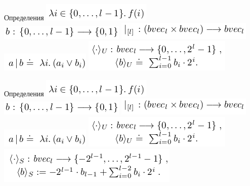 \documentclass{beamer}
\begin{document}
\begin{frame}{Определения}
\includegraphics[scale=0.5]{lambda.png}\newline
\includegraphics[scale=0.5]{vector.png}\newline
\includegraphics[scale=0.5]{or1.png}\newline
\includegraphics[scale=0.5]{or2.png}\newline
\includegraphics[scale=0.5]{unsigned.png}\newline
\end{frame}

\begin{frame}{Определения}
\includegraphics[scale=0.5]{lambda.png}\newline
\includegraphics[scale=0.5]{vector.png}\newline
\includegraphics[scale=0.5]{or1.png}\newline
\includegraphics[scale=0.5]{or2.png}\newline
\includegraphics[scale=0.5]{unsigned.png}\newline
\includegraphics[scale=0.5]{signed.png}\newline
\end{frame}
\end{document}
